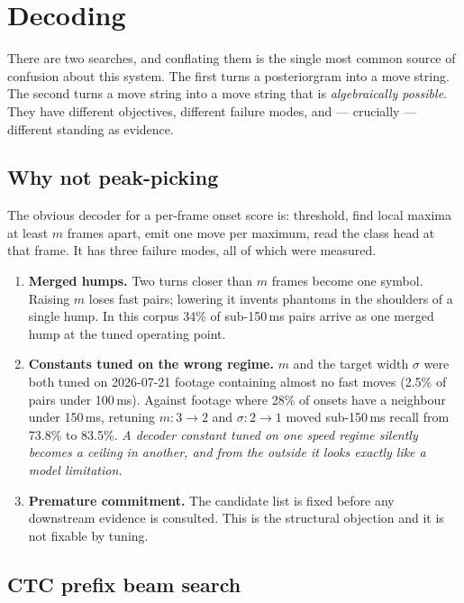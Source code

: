 \section{Decoding}
\label{sec:decode}

There are two searches, and conflating them is the single most common source
of confusion about this system. The first turns a posteriorgram into a move
string. The second turns a move string into a move string that is
\emph{algebraically possible}. They have different objectives, different
failure modes, and --- crucially --- different standing as evidence.

\subsection{Why not peak-picking}
\label{sec:peakpick}

The obvious decoder for a per-frame onset score is: threshold, find local
maxima at least $m$ frames apart, emit one move per maximum, read the class
head at that frame. It has three failure modes, all of which were measured.

\begin{enumerate}[leftmargin=1.4em,itemsep=2pt]
\item \textbf{Merged humps.} Two turns closer than $m$ frames become one
symbol. Raising $m$ loses fast pairs; lowering it invents phantoms in the
shoulders of a single hump. In this corpus 34\% of sub-150\,ms pairs arrive
as one merged hump at the tuned operating point.
\item \textbf{Constants tuned on the wrong regime.} $m$ and the target width
$\sigma$ were both tuned on 2026-07-21 footage containing almost no fast
moves (2.5\% of pairs under 100\,ms). Against footage where 28\% of onsets
have a neighbour under 150\,ms, retuning $m: 3\to2$ and $\sigma: 2\to1$ moved
sub-150\,ms recall from 73.8\% to 83.5\%. \emph{A decoder constant tuned on
one speed regime silently becomes a ceiling in another, and from the outside
it looks exactly like a model limitation.}
\item \textbf{Premature commitment.} The candidate list is fixed before any
downstream evidence is consulted. This is the structural objection and it is
not fixable by tuning.
\end{enumerate}

\subsection{CTC prefix beam search}
\label{sec:prefixbeam}

